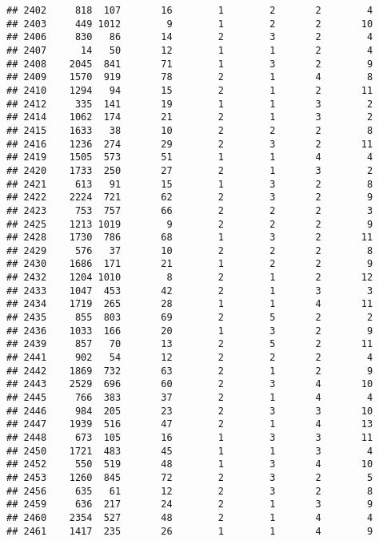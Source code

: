 \documentclass[]{article}
\begin{document}
\begin{verbatim}
## 2402     818  107       16        1        2       2        4
## 2403     449 1012        9        1        2       2       10
## 2406     830   86       14        2        3       2        4
## 2407      14   50       12        1        1       2        4
## 2408    2045  841       71        1        3       2        9
## 2409    1570  919       78        2        1       4        8
## 2410    1294   94       15        2        1       2       11
## 2412     335  141       19        1        1       3        2
## 2414    1062  174       21        2        1       3        2
## 2415    1633   38       10        2        2       2        8
## 2416    1236  274       29        2        3       2       11
## 2419    1505  573       51        1        1       4        4
## 2420    1733  250       27        2        1       3        2
## 2421     613   91       15        1        3       2        8
## 2422    2224  721       62        2        3       2        9
## 2423     753  757       66        2        2       2        3
## 2425    1213 1019        9        2        2       2        9
## 2428    1730  786       68        1        3       2       11
## 2429     576   37       10        2        2       2        8
## 2430    1686  171       21        1        2       2        9
## 2432    1204 1010        8        2        1       2       12
## 2433    1047  453       42        2        1       3        3
## 2434    1719  265       28        1        1       4       11
## 2435     855  803       69        2        5       2        2
## 2436    1033  166       20        1        3       2        9
## 2439     857   70       13        2        5       2       11
## 2441     902   54       12        2        2       2        4
## 2442    1869  732       63        2        1       2        9
## 2443    2529  696       60        2        3       4       10
## 2445     766  383       37        2        1       4        4
## 2446     984  205       23        2        3       3       10
## 2447    1939  516       47        2        1       4       13
## 2448     673  105       16        1        3       3       11
## 2450    1721  483       45        1        1       3        4
## 2452     550  519       48        1        3       4       10
## 2453    1260  845       72        2        3       2        5
## 2456     635   61       12        2        3       2        8
## 2459     636  217       24        2        1       3        9
## 2460    2354  527       48        2        1       4        4
## 2461    1417  235       26        1        1       4        9

\end{verbatim}
\end{document}
